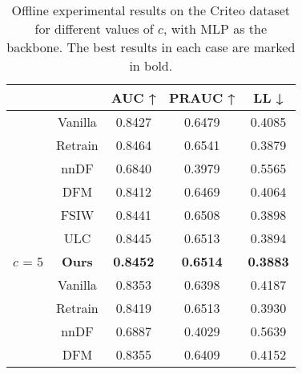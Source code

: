 \begin{table}[htbp]
\caption{Offline experimental results on the Criteo dataset for different values of $c$, with MLP as the backbone. The best results in each case are marked in bold.}
\begin{tabular}{cc|ccc}
\toprule
    \multicolumn{2}{c|}{\textbf{}}                                            & {AUC ↑}                & {PRAUC ↑}              & {LL ↓}                 \\ \midrule
    \multicolumn{1}{c|}{}                                  & {Vanilla} & 0.8427                      & 0.6479                      & 0.4085                      \\
    \multicolumn{1}{c|}{}                                  & {Retrain} & {0.8464} & {0.6541} & {0.3879} \\
     \cline{2-5}
    \multicolumn{1}{c|}{}                                  & {nnDF}    & 0.6840                        & 0.3979                        & 0.5565                        \\
    \multicolumn{1}{c|}{}                                  & {DFM}     & 0.8412                        & 0.6469                        & 0.4064                        \\
    \multicolumn{1}{c|}{}                                  & {FSIW}    & 0.8441                        & 0.6508                        & 0.3898                        \\
    \multicolumn{1}{c|}{}                                  & {ULC}     & 0.8445                        & 0.6513                        & 0.3894                      \\
    \multicolumn{1}{c|}{\multirow{-7}{*}{{$c$ = 5}}}  & \textbf{Ours}    & \textbf{0.8452}               & \textbf{0.6514}               & 
    \textbf{0.3883}             \\ \midrule
    \multicolumn{1}{c|}{}                                  & {Vanilla} & 0.8353                        & 0.6398                        & 0.4187                        \\
    \multicolumn{1}{c|}{}                                  & {Retrain} & {0.8419} & {0.6513} & {0.3930}  \\\cline{2-5}
    \multicolumn{1}{c|}{}                                  & {nnDF}    & 0.6887                        & 0.4029                        & 0.5639                        \\
    \multicolumn{1}{c|}{}                                  & {DFM}     & 0.8355                        & 0.6409                        & 0.4152                        \\

\end{tabular}
\end{table}

